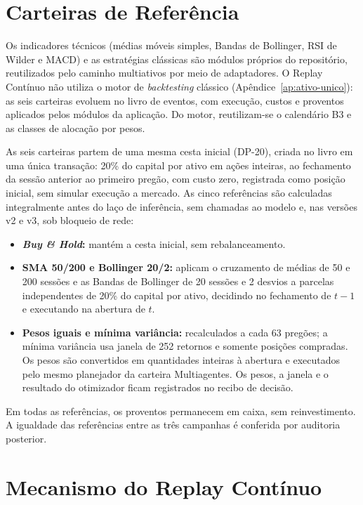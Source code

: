 \section{Carteiras de Referência}
\label{sec:arq-referencias}

Os indicadores técnicos (médias móveis simples, Bandas de Bollinger, RSI de Wilder e MACD) e as estratégias clássicas são módulos próprios do repositório, reutilizados pelo caminho multiativos por meio de adaptadores. O Replay Contínuo não utiliza o motor de \textit{backtesting} clássico (Apêndice~\ref{ap:ativo-unico}): as seis carteiras evoluem no livro de eventos, com execução, custos e proventos aplicados pelos módulos da aplicação. Do motor, reutilizam-se o calendário B3 e as classes de alocação por pesos.

As seis carteiras partem de uma mesma cesta inicial (\mbox{DP-20}), criada no livro em uma única transação: 20\% do capital por ativo em ações inteiras, ao fechamento da sessão anterior ao primeiro pregão, com custo zero, registrada como posição inicial, sem simular execução a mercado. As cinco referências são calculadas integralmente antes do laço de inferência, sem chamadas ao modelo e, nas versões v2 e v3, sob bloqueio de rede:

\begin{itemize}
  \item \textbf{\textit{Buy \& Hold}:} mantém a cesta inicial, sem rebalanceamento.
  \item \textbf{SMA 50/200 e Bollinger 20/2:} aplicam o cruzamento de médias de 50 e 200 sessões e as Bandas de Bollinger de 20 sessões e 2 desvios a parcelas independentes de 20\% do capital por ativo, decidindo no fechamento de $t-1$ e executando na abertura de $t$.
  \item \textbf{Pesos iguais e mínima variância:} recalculados a cada 63 pregões; a mínima variância usa janela de 252 retornos e somente posições compradas. Os pesos são convertidos em quantidades inteiras à abertura e executados pelo mesmo planejador da carteira Multiagentes. Os pesos, a janela e o resultado do otimizador ficam registrados no recibo de decisão.
\end{itemize}

Em todas as referências, os proventos permanecem em caixa, sem reinvestimento. A igualdade das referências entre as três campanhas é conferida por auditoria posterior.

\section{Mecanismo do Replay Contínuo}
\label{sec:arq-replay}

